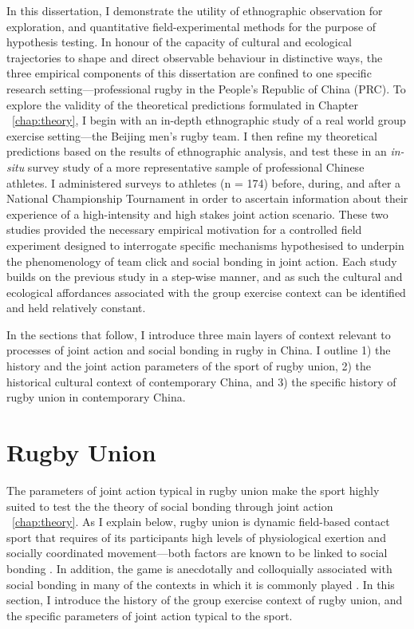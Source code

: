 \begin{CJK}{UTF8}{gbsn}
In this dissertation, I demonstrate the utility of ethnographic observation for exploration, and quantitative field-experimental methods for the purpose of hypothesis testing.  In honour of the capacity of cultural and ecological trajectories to shape and direct observable behaviour in distinctive ways, the three empirical components of this dissertation are confined to one specific research setting---professional rugby in the People's Republic of China (PRC).   To explore the validity of the theoretical predictions formulated in Chapter ~\ref{chap:theory}, I begin with an in-depth ethnographic study of a real world group exercise setting---the Beijing men's rugby team.  I then refine my theoretical predictions based on the results of ethnographic analysis, and test these in an \textit{in-situ} survey study of a more representative sample of professional Chinese athletes. I administered surveys to athletes (n = 174) before, during, and after a National Championship Tournament in order to ascertain information about their experience of a high-intensity and high stakes joint action scenario.  These two studies provided the necessary empirical motivation for a controlled field experiment designed to interrogate specific mechanisms hypothesised to underpin the phenomenology of team click and social bonding in joint action.  Each study builds on the previous study in a step-wise manner, and as such the cultural and ecological affordances associated with the group exercise context can be identified and held relatively constant.

In the sections that follow, I introduce three main layers of context relevant to processes of joint action and social bonding in rugby in China.  I outline 1) the history and the joint action parameters of the sport of rugby union, 2) the historical cultural context of contemporary China, and 3) the specific history of rugby union in contemporary China.




\section{Rugby Union\label{sect:rugbyUnion}}

The parameters of joint action typical in rugby union make the sport highly suited to test the the theory of social bonding through joint action ~\ref{chap:theory}.  As I explain below, rugby union is dynamic field-based contact sport that requires of its participants high levels of physiological exertion and socially coordinated movement---both factors are known to be linked to social bonding \citep{Cohen2017}. In addition, the game is anecdotally and colloquially associated with social bonding in many of the contexts in which it is commonly played \citep{Dunning2005}.  In this section, I introduce the history of the group exercise context of rugby union, and the specific parameters of joint action typical to the sport.


\end{CJK}
